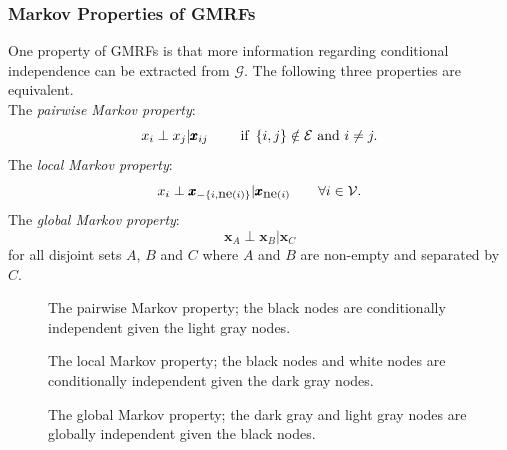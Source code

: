 \subsubsection{Markov Properties of GMRFs}
One property of GMRFs is that more information regarding conditional independence can be extracted from $\mathcal{G}$. The following three properties are equivalent. \\
The \textit{pairwise Markov property}:
\begin{equation*}
    x_i\perp x_j|\pmb{x}_{ij}\hspace{20pt}\hbox{ if }\left\lbrace i,j\right\rbrace\notin\mathcal{E}\hbox{ and }i\neq j.
\end{equation*}
The \textit{local Markov property}:
\begin{equation*}
    x_i\perp \pmb{x}_{-\left\lbrace i, \hbox{ne}\left(i\right)\right\rbrace}|\pmb{x}_{\hbox{ne}\left(i\right)}\hspace{20pt}\forall i\in\mathcal{V}.
\end{equation*}
The \textit{global Markov property}:
\begin{equation*}
    \pmb{x}_{A}\perp \pmb{x}_{B}|\pmb{x}_{C}
\end{equation*}
for all disjoint sets $A$, $B$ and $C$ where $A$ and $B$ are non-empty and separated by $C$. 
\begin{figure}[H]
    \centering
    \caption{The pairwise Markov property; the black nodes are conditionally independent given the light gray nodes.}
    \label{fig:pairwise}
\end{figure}
\begin{figure}[H]
    \centering
    \caption{The local Markov property; the black nodes and white nodes are conditionally independent given the dark gray nodes.}
    \label{fig:local}
\end{figure}
\begin{figure}[H]
    \centering
    \caption{The global Markov property; the dark gray and light gray nodes are globally independent given the black nodes.}
    \label{fig:global}
\end{figure}

